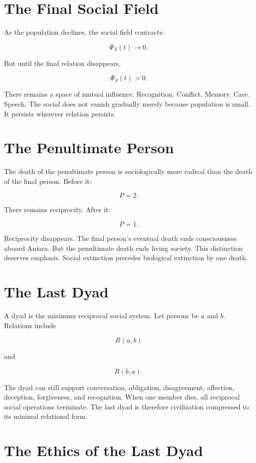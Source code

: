 \documentclass[11pt,oneside]{book}
\theoremstyle{definition}
\theoremstyle{remark}
\begin{document}
\section{The Final Social Field}

As the population declines, the social field contracts:

\[
\Phi_S(t)\rightarrow0.
\]

But until the final relation disappears,

\[
\Phi_S(t)>0.
\]

There remains a space of mutual influence. Recognition. Conflict. Memory. Care. Speech. The social
does not vanish gradually merely because population is small. It persists wherever relation
persists.

\section{The Penultimate Person}

The death of the penultimate person is sociologically more radical than the death of the final
person. Before it:

\[
P=2.
\]

There remains reciprocity. After it:

\[
P=1.
\]

Reciprocity disappears. The final person's eventual death ends consciousness aboard Aniara. But the
penultimate death ends living society. This distinction deserves emphasis. Social extinction
precedes biological extinction by one death.

\section{The Last Dyad}

A dyad is the minimum reciprocal social system. Let persons be \(a\) and \(b\). Relations include

\[
R(a,b)
\]

and

\[
R(b,a).
\]

The dyad can still support conversation, obligation, disagreement, affection, deception,
forgiveness, and recognition. When one member dies, all reciprocal social operations terminate. The
last dyad is therefore civilization compressed to its minimal relational form.

\section{The Ethics of the Last Dyad}
\end{document}
